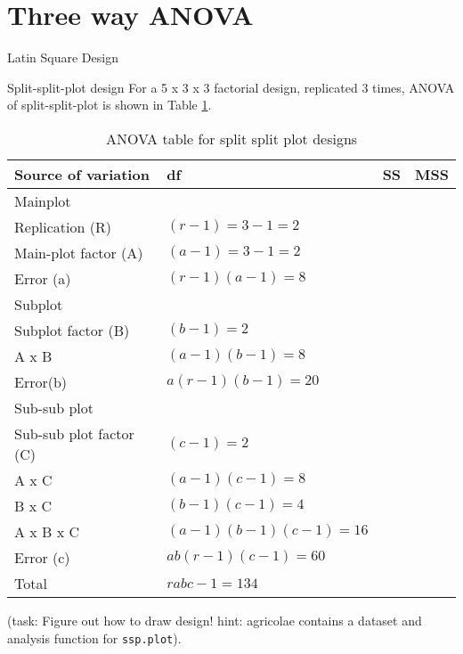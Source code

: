 \documentclass[
  ignorenonframetext,
  aspectratio=169]{beamer}
\begin{document}
\hypertarget{three-way-anova}{%
\section{Three way ANOVA}\label{three-way-anova}}

\begin{frame}{Latin Square Design}
\protect\hypertarget{latin-square-design}{}
\end{frame}

\begin{frame}[fragile]{Split-split-plot design}
\protect\hypertarget{split-split-plot-design}{}
For a 5 x 3 x 3 factorial design, replicated 3 times, ANOVA of
split-split-plot is shown in Table \ref{tab:anova-split-split-plot}.

\begingroup\fontsize{8}{10}\selectfont

\begin{longtable}[t]{llll}
\caption{\label{tab:anova-split-split-plot}ANOVA table for split split plot designs}\\
\toprule
Source of variation & df & SS & MSS\\
\midrule
Mainplot &  &  & \\
\hspace{1em}Replication (R) & $(r-1) = 3-1 = 2$ &  & \\
\hspace{1em}Main-plot factor (A) & $(a-1) = 3-1 = 2$ &  & \\
\hspace{1em}Error (a) & $(r-1)(a-1) = 8$ &  & \\
Subplot &  &  & \\
\addlinespace
\hspace{1em}Subplot factor (B) & $(b-1) = 2$ &  & \\
\hspace{1em}A x B & $(a-1)(b-1) = 8$ &  & \\
\hspace{1em}Error(b) & $a(r-1)(b-1) = 20$ &  & \\
Sub-sub plot &  &  & \\
\hspace{1em}Sub-sub plot factor (C) & $(c-1) = 2$ &  & \\
\addlinespace
\hspace{1em}A x C & $(a-1)(c-1) = 8$ &  & \\
\hspace{1em}B x C & $(b-1)(c-1) = 4$ &  & \\
\hspace{1em}A x B x C & $(a-1)(b-1)(c-1) = 16$ &  & \\
\hspace{1em}Error (c) & $ab(r-1)(c-1) = 60$ &  & \\
Total & $rabc-1 = 134$ &  & \\
\bottomrule
\end{longtable}
\endgroup{}

(task: Figure out how to draw design! hint: agricolae contains a dataset
and analysis function for \texttt{ssp.plot}).
\end{frame}
\end{document}
